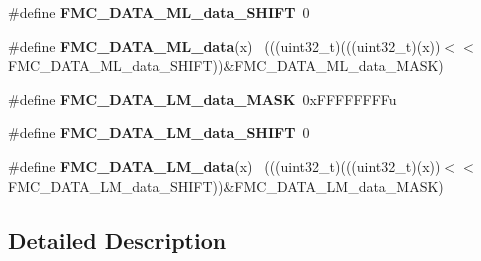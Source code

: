 \begin{DoxyCompactItemize}
\item 
\hypertarget{group___f_m_c___register___masks_gaf8f321dbfe895234308a7ca9ff551f86}{}\#define {\bfseries F\+M\+C\+\_\+\+D\+A\+T\+A\+\_\+\+M\+L\+\_\+data\+\_\+\+S\+H\+I\+F\+T}~0\label{group___f_m_c___register___masks_gaf8f321dbfe895234308a7ca9ff551f86}

\item 
\hypertarget{group___f_m_c___register___masks_ga63770fcaee9bfc7abfa6c2b9aec00247}{}\#define {\bfseries F\+M\+C\+\_\+\+D\+A\+T\+A\+\_\+\+M\+L\+\_\+data}(x)                                        ~(((uint32\+\_\+t)(((uint32\+\_\+t)(x))$<$$<$F\+M\+C\+\_\+\+D\+A\+T\+A\+\_\+\+M\+L\+\_\+data\+\_\+\+S\+H\+I\+F\+T))\&F\+M\+C\+\_\+\+D\+A\+T\+A\+\_\+\+M\+L\+\_\+data\+\_\+\+M\+A\+S\+K)\label{group___f_m_c___register___masks_ga63770fcaee9bfc7abfa6c2b9aec00247}

\item 
\hypertarget{group___f_m_c___register___masks_gae8b10ffbafd4b7ef447a886d6b922c2c}{}\#define {\bfseries F\+M\+C\+\_\+\+D\+A\+T\+A\+\_\+\+L\+M\+\_\+data\+\_\+\+M\+A\+S\+K}~0x\+F\+F\+F\+F\+F\+F\+F\+Fu\label{group___f_m_c___register___masks_gae8b10ffbafd4b7ef447a886d6b922c2c}

\item 
\hypertarget{group___f_m_c___register___masks_ga59dd1d6093c9450458aa7b9fae4b3e51}{}\#define {\bfseries F\+M\+C\+\_\+\+D\+A\+T\+A\+\_\+\+L\+M\+\_\+data\+\_\+\+S\+H\+I\+F\+T}~0\label{group___f_m_c___register___masks_ga59dd1d6093c9450458aa7b9fae4b3e51}

\item 
\hypertarget{group___f_m_c___register___masks_ga4d03853d5c9ba4523db7ae8919cd46df}{}\#define {\bfseries F\+M\+C\+\_\+\+D\+A\+T\+A\+\_\+\+L\+M\+\_\+data}(x)                                        ~(((uint32\+\_\+t)(((uint32\+\_\+t)(x))$<$$<$F\+M\+C\+\_\+\+D\+A\+T\+A\+\_\+\+L\+M\+\_\+data\+\_\+\+S\+H\+I\+F\+T))\&F\+M\+C\+\_\+\+D\+A\+T\+A\+\_\+\+L\+M\+\_\+data\+\_\+\+M\+A\+S\+K)\label{group___f_m_c___register___masks_ga4d03853d5c9ba4523db7ae8919cd46df}

\end{DoxyCompactItemize}


\subsection{Detailed Description}
